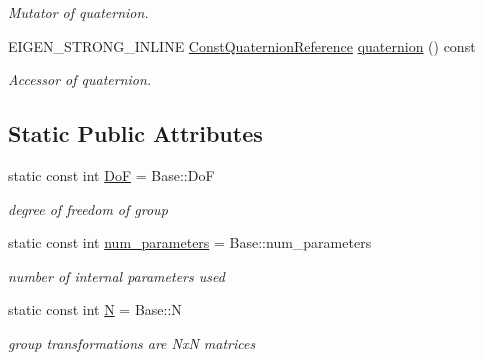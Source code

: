 \begin{DoxyCompactItemize}
\begin{DoxyCompactList}\small\item\em Mutator of quaternion. \end{DoxyCompactList}\item 
E\+I\+G\+E\+N\+\_\+\+S\+T\+R\+O\+N\+G\+\_\+\+I\+N\+L\+I\+NE \hyperlink{class_sophus_1_1_rx_s_o3_group_a03c34f6992514111a4fb03a1edce083f}{Const\+Quaternion\+Reference} \hyperlink{class_sophus_1_1_rx_s_o3_group_a59656a350e486b5375b1bc5dfae8333a}{quaternion} () const \hypertarget{class_sophus_1_1_rx_s_o3_group_a59656a350e486b5375b1bc5dfae8333a}{}\label{class_sophus_1_1_rx_s_o3_group_a59656a350e486b5375b1bc5dfae8333a}

\begin{DoxyCompactList}\small\item\em Accessor of quaternion. \end{DoxyCompactList}\end{DoxyCompactItemize}
\subsection*{Static Public Attributes}
\begin{DoxyCompactItemize}
\item 
static const int \hyperlink{class_sophus_1_1_rx_s_o3_group_a4080b614adcd54d45e835b155717f4e7}{DoF} = Base\+::\+DoF\hypertarget{class_sophus_1_1_rx_s_o3_group_a4080b614adcd54d45e835b155717f4e7}{}\label{class_sophus_1_1_rx_s_o3_group_a4080b614adcd54d45e835b155717f4e7}

\begin{DoxyCompactList}\small\item\em degree of freedom of group \end{DoxyCompactList}\item 
static const int \hyperlink{class_sophus_1_1_rx_s_o3_group_a2338a5de2ec08107613f52f325e8d83c}{num\+\_\+parameters} = Base\+::num\+\_\+parameters\hypertarget{class_sophus_1_1_rx_s_o3_group_a2338a5de2ec08107613f52f325e8d83c}{}\label{class_sophus_1_1_rx_s_o3_group_a2338a5de2ec08107613f52f325e8d83c}

\begin{DoxyCompactList}\small\item\em number of internal parameters used \end{DoxyCompactList}\item 
static const int \hyperlink{class_sophus_1_1_rx_s_o3_group_a277309f659efc31d66f52a6f04dafcc0}{N} = Base\+::N\hypertarget{class_sophus_1_1_rx_s_o3_group_a277309f659efc31d66f52a6f04dafcc0}{}\label{class_sophus_1_1_rx_s_o3_group_a277309f659efc31d66f52a6f04dafcc0}

\begin{DoxyCompactList}\small\item\em group transformations are NxN matrices \end{DoxyCompactList}\end{DoxyCompactItemize}
